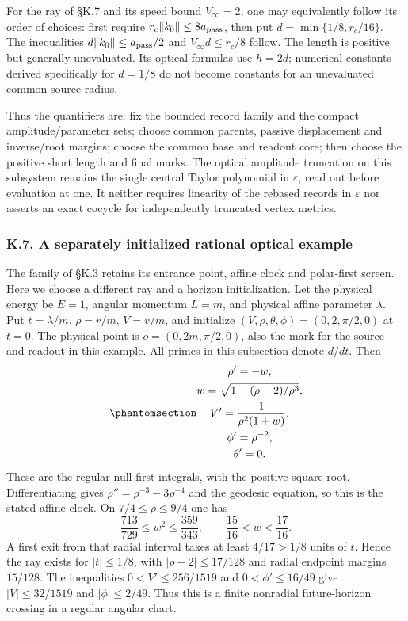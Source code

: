 \documentclass[
  english,
  11pt,
  reqno]{amsart}
\begin{document}
For the ray of §K.7 and its speed bound \(V_\infty=2\), one may
equivalently follow its order of choices: first require
\(r_c\|k_0\|\le8a_{\rm pass}\), then put \(d=\min\{1/8,r_c/16\}\). The
inequalities \(d\|k_0\|\le a_{\rm pass}/2\) and \(V_\infty d\le r_c/8\)
follow. The length is positive but generally unevaluated. Its optical
formulas use \(h=2d\); numerical constants derived specifically for
\(d=1/8\) do not become constants for an unevaluated common source
radius.

Thus the quantifiers are: fix the bounded record family and the compact
amplitude/parameter sets; choose common parents, passive displacement
and inverse/root margins; choose the common base and readout core; then
choose the positive short length and final marks. The optical amplitude
truncation on this subsystem remains the single central Taylor
polynomial in \(\varepsilon\), read out before evaluation at one. It
neither requires linearity of the rebased records in \(\varepsilon\) nor
asserts an exact cocycle for independently truncated vertex metrics.

\protect{}\label{sec:sch-r1-rational-optics}

\subsubsection{K.7. A separately initialized rational optical
example}\label{k.7.-a-separately-initialized-rational-optical-example}

The family of §K.3 retains its entrance point, affine clock and
polar-first screen. Here we choose a different ray and a horizon
initialization. Let the physical energy be \(E=1\), angular momentum
\(L=m\), and physical affine parameter \(\lambda\). Put \(t=\lambda/m\),
\(\rho=r/m\), \(V=v/m\), and initialize
\((V,\rho,\theta,\phi)=(0,2,\pi/2,0)\) at \(t=0\). The physical point is
\(o=(0,2m,\pi/2,0)\), also the mark for the source and readout in this
example. All primes in this subsection denote \(d/dt\). Then
\begin{equation}\protect\phantomsection\label{eq:sch-r1-central-ray}{\begin{gathered}
\rho'=-w, \\
w=\sqrt{1-(\rho-2)/\rho^3}, \\
V'=\frac1{\rho^2(1+w)}, \\
\phi'=\rho^{-2}, \\
\theta'=0.
\end{gathered}}\end{equation} These are the regular null first integrals, with the
positive square root. Differentiating gives
\(\rho''=\rho^{-3}-3\rho^{-4}\) and the geodesic equation, so this is
the stated affine clock. On \(7/4\le\rho\le9/4\) one has \[
 \frac{713}{729}\le w^2\le\frac{359}{343},\qquad
 \frac{15}{16}<w<\frac{17}{16}.
\] A first exit from that radial interval takes at least \(4/17>1/8\)
units of \(t\). Hence the ray exists for \(|t|\le1/8\), with
\(|\rho-2|\le17/128\) and radial endpoint margins \(15/128\). The
inequalities \(0<V'\le256/1519\) and \(0<\phi'\le16/49\) give
\(|V|\le32/1519\) and \(|\phi|\le2/49\). Thus this is a finite nonradial
future-horizon crossing in a regular angular chart.
\end{document}
